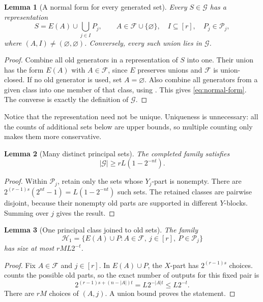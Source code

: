 \documentclass[11pt]{article}
\newtheorem{lemma}[lemma]{Lemma}
\newcommand{\Pp}{\mathcal{P}}
\newcommand{\<}{\langle}
\renewcommand{\>}{\rangle}
\newcommand{\F}{\mathcal{F}}
\newcommand{\G}{\mathcal{G}}
\newcommand{\Hh}{\mathcal{H}}
\numberwithin{equation}{section}
\begin{document}
\begin{lemma}[A normal form for every generated set]\label{lem:normal-form}
Every $S\in\G$ has a representation
\begin{equation}\label{eq:normal-form}
 S=E(A)\cup\bigcup_{j\in I}P_j,
 \qquad A\in\F\cup\{\varnothing\},\quad I\subseteq[r],\quad P_j\in\Pp_j,
\end{equation}
where $(A,I)\ne(\varnothing,\varnothing)$. Conversely, every such union lies
in $\G$.
\end{lemma}
\begin{proof}
Combine all old generators in a representation of $S$ into one. Their union
has the form $E(A)$ with $A\in\F$, since $E$ preserves unions and $\F$ is
union-closed. If no old generator is used, set $A=\varnothing$. Also combine
all generators from a given class into one member of that class, using
. This gives \eqref{eq:normal-form}.
The converse is exactly the definition of $\G$.

\end{proof}

Notice that the representation need not be unique. Uniqueness is unnecessary: all the
counts of additional sets below are upper bounds, so multiple counting only
makes them more conservative.

\begin{lemma}[Many distinct principal sets]\label{lem:denominator}
The completed family satisfies
\begin{equation}\label{eq:denominator}
 |\G|\ge rL(1-2^{-nt}).
\end{equation}
\end{lemma}
\begin{proof}
Within $\Pp_j$, retain only the sets whose $Y_j$-part is nonempty. There are
$2^{(r-1)s}(2^{nt}-1)=L(1-2^{-nt})$ such sets. The retained classes are
pairwise disjoint, because their nonempty old parts are supported in
different $Y$-blocks. Summing over $j$ gives the result.
\end{proof}

\begin{lemma}[One principal class joined to old sets]\label{lem:one-class-old}
The family
\[
 \Hh_1=\{E(A)\cup P:A\in\F,\ j\in[r],\ P\in\Pp_j\}
\]
has size at most $rML2^{-t}$.
\end{lemma}
\begin{proof}
Fix $A\in\F$ and $j\in[r]$. In $E(A)\cup P$, the $X$-part has
$2^{(r-1)s}$ choices.  counts the possible
old parts, so the exact number of outputs for this fixed pair is
\[
 2^{(r-1)s+(n-|A|)t}=L2^{-|A|t}\le L2^{-t}.
\]
There are $rM$ choices of $(A,j)$. A union bound proves the statement.
\end{proof}
\end{document}
